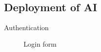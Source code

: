 \documentclass{beamer}
\begin{document}
\subsection{Deployment of AI}
\begin{frame}{Authentication}
\begin{figure}[H]
\caption{Login form}
\end{figure}
\end{frame}
\end{document}

